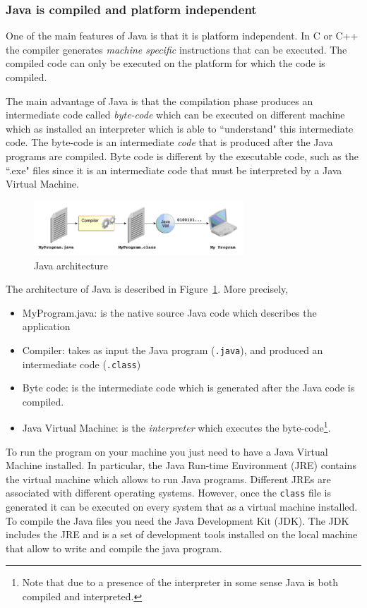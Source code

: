 \documentclass{article}
\theoremstyle{definition}
\begin{document}
\subsubsection{Java is compiled and platform independent}
One of the main features of Java is that it is platform independent. In C or C++ the compiler generates \emph{machine specific} instructions that can be executed. The compiled code can only be executed on the platform for which the code is compiled.

The main advantage of Java is that the compilation phase produces an intermediate code called \emph{byte-code} which can be executed on different machine which as installed an interpreter which is able to ``understand" this intermediate code.
The byte-code is an intermediate \emph{code} that is produced after the Java programs are compiled.  Byte code is different by the executable code, such as the ``.exe" files since it is an intermediate code that must be interpreted by a Java Virtual Machine.

\begin{figure}[h]
\centering
    \includegraphics[width=0.7\textwidth]{Img/jvm-architecture.png}
    \caption{Java architecture}
    \label{JavaArchitecture}
\end{figure}

The architecture of Java is described in Figure~\ref{JavaArchitecture}. More precisely,

\begin{itemize}
\item MyProgram.java: is the native source Java code which describes the application 
\item Compiler: takes as input the Java program (\texttt{.java}), and produced an intermediate code (\texttt{.class})
\item Byte code: is the intermediate code which is generated after the Java code is compiled.
\item Java Virtual Machine: is the \emph{interpreter} which executes the byte-code\footnote{Note that due to a presence of the interpreter in some sense Java is both compiled and interpreted.}.
\end{itemize}

To run the program on your machine you just need to have a Java Virtual Machine installed. In particular, the Java Run-time Environment (JRE) contains the virtual machine which allows to run Java programs. Different JREs are associated with different operating systems. However, once the \texttt{class} file is generated it can be executed on every system that as a virtual machine installed. \\
To compile the Java files you need the  Java Development Kit (JDK). The JDK includes the JRE and is a set of development tools installed on the local machine that allow to write and compile the java program.
\end{document}
